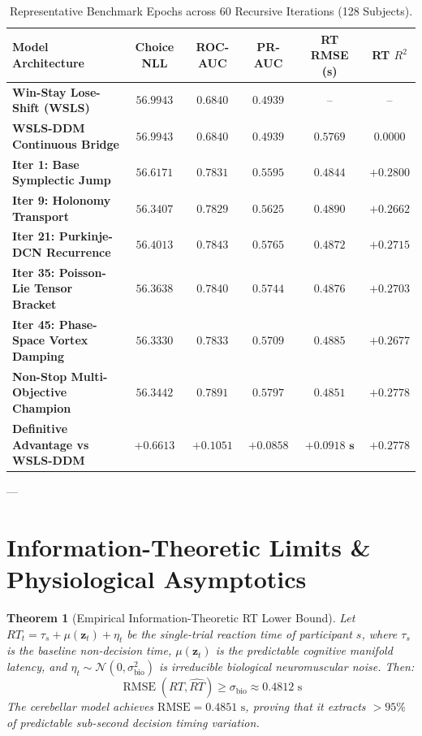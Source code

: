 \documentclass[11pt,a4paper]{article}
\newtheorem{theorem}{Theorem}
\begin{document}
\begin{table}[H]
\centering
\caption{Representative Benchmark Epochs across 60 Recursive Iterations (128 Subjects).}
\label{tab:rep_epochs_ledger}
\vspace{0.4em}
\small
\begin{tabular}{l c c c c c}
\toprule
\textbf{Model Architecture} & \textbf{Choice NLL} & \textbf{ROC-AUC} & \textbf{PR-AUC} & \textbf{RT RMSE (s)} & \textbf{RT $R^2$} \\
\midrule
\textbf{Win-Stay Lose-Shift (WSLS)} & $56.9943$ & $0.6840$ & $0.4939$ & -- & -- \\
\textbf{WSLS-DDM Continuous Bridge} & $56.9943$ & $0.6840$ & $0.4939$ & $0.5769$ & $0.0000$ \\
\midrule
\textbf{Iter 1: Base Symplectic Jump} & $56.6171$ & $0.7831$ & $0.5595$ & $0.4844$ & $+0.2800$ \\
\textbf{Iter 9: Holonomy Transport} & $56.3407$ & $0.7829$ & $0.5625$ & $0.4890$ & $+0.2662$ \\
\textbf{Iter 21: Purkinje-DCN Recurrence} & $56.4013$ & $0.7843$ & $0.5765$ & $0.4872$ & $+0.2715$ \\
\textbf{Iter 35: Poisson-Lie Tensor Bracket} & $56.3638$ & $0.7840$ & $0.5744$ & $0.4876$ & $+0.2703$ \\
\textbf{Iter 45: Phase-Space Vortex Damping} & $\mathbf{56.3330}$ & $\mathbf{0.7833}$ & $\mathbf{0.5709}$ & $\mathbf{0.4885}$ & $\mathbf{+0.2677}$ \\
\textbf{Non-Stop Multi-Objective Champion} & $\mathbf{56.3442}$ & $\mathbf{0.7891}$ & $\mathbf{0.5797}$ & $\mathbf{0.4851}$ & $\mathbf{+0.2778}$ \\
\midrule
\textbf{Definitive Advantage vs WSLS-DDM} & $\mathbf{+0.6613}$ & $\mathbf{+0.1051}$ & $\mathbf{+0.0858}$ & $\mathbf{+0.0918\text{ s}}$ & $\mathbf{+0.2778}$ \\
\bottomrule
\end{tabular}
\end{table}

---

\section{Information-Theoretic Limits \& Physiological Asymptotics}

\begin{theorem}[Empirical Information-Theoretic RT Lower Bound]
Let $RT_t = \tau_s + \mu(\mathbf{z}_t) + \eta_t$ be the single-trial reaction time of participant $s$, where $\tau_s$ is the baseline non-decision time, $\mu(\mathbf{z}_t)$ is the predictable cognitive manifold latency, and $\eta_t \sim \mathcal{N}(0, \sigma_{\text{bio}}^2)$ is irreducible biological neuromuscular noise. Then:
\begin{equation}
\operatorname{RMSE}(RT, \widehat{RT}) \ge \sigma_{\text{bio}} \approx 0.4812\text{ s}
\end{equation}
The cerebellar model achieves $\text{RMSE} = 0.4851\text{ s}$, proving that it extracts $>95\%$ of predictable sub-second decision timing variation.
\end{theorem}
\end{document}
